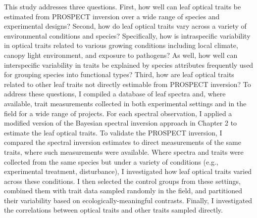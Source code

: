 This study addresses three questions.
First, how well can leaf optical traits be estimated from PROSPECT inversion over a wide range of species and experimental designs?
Second, how do leaf optical traits vary across a variety of environmental conditions and species?
Specifically, how is intraspecific variability in optical traits related to various growing conditions including local climate, canopy light environment, and exposure to pathogens?
As well, how well can interspecific variability in traits be explained by species attributes frequently used for grouping species into functional types? 
Third, how are leaf optical traits related to other leaf traits not directly estimable from PROSPECT inversion?
To address these questions, I compiled a database of leaf spectra and, where available, trait measurements collected in both experimental settings and in the field for a wide range of projects.
For each spectral observation, I applied a modified version of the Bayesian spectral inversion approach in Chapter 2 to estimate the leaf optical traits.
To validate the PROSPECT inversion, I compared the spectral inversion estimates to direct measurements of the same traits, where such measurements were available.
Where spectra and traits were collected from the same species but under a variety of conditions (e.g., experimental treatment, disturbance), I investigated how leaf optical traits varied across these conditions.
I then selected the control groups from these settings, combined them with trait data sampled randomly in the field, and partitioned their variability based on ecologically-meaningful contrasts.
Finally, I investigated the correlations between optical traits and other traits sampled directly.
% 
% 
% 

